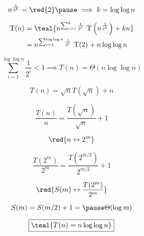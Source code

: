 \begin{frame}{}
  \[
    n^{\frac{1}{2^k}} = \red{2} \pause \implies k = \log\log n
  \]

  \pause
  \vspace{-0.30cm}
  \begin{align*} 
    \text{T}(n) &= \teal{n^{\sum_{i=1}^{k}\frac{1}{2^i}}\ \text{T}\left(n^{\frac{1}{2^k}}\right) + kn}\\ 
	    &=n^{\sum_{i=1}^{\log\log n}\frac{1}{2^i}}\ \text{T}(2) + n \log\log n\\ 
  \end{align*}

  \pause
  \vspace{-0.30cm}
  \[
    \sum_{i=1}^{\log \log n}\frac{1}{2^i} < 1 \implies T(n) = \Theta(n \log \log n)
  \]

  \pause
  \vspace{0.40cm}
  \centerline{}
\end{frame}

\begin{frame}{}
  \[
    \boxed{T(n) = \sqrt{n} T(\sqrt{n}) + n}
  \]

  \pause
  \[
    \frac{T(n)}{n} = \frac{T(\sqrt{n})}{\sqrt{n}} + 1
  \]

  \pause
  \[
    \red{n \leftrightarrow 2^m}
  \]

  \pause
  \[
    \frac{T(2^m)}{2^m} = \frac{T(2^{m/2})}{2^{m/2}} + 1
  \]

  \pause
  \[
    \red{S(m) \leftrightarrow \frac{T(2^m)}{2^m}}
  \]

  \pause
  \[
    S(m) = S(m/2) + 1 = \pause \Theta(\log m)
  \]

  \pause
  \vspace{-0.60cm}
  \[
    \boxed{\teal{T(n) = n \log \log n}}
  \]
\end{frame}

\begin{frame}{}
  \centerline{}

\end{frame}
